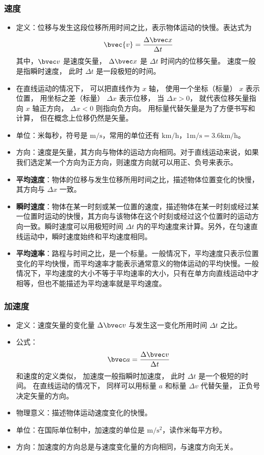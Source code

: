 \subsubsection{速度}
\begin{itemize}
\item 定义：位移与发生这段位移所用时间之比，表示物体运动的快慢。表达式为
\begin{equation}\label{eq_HSPM01_3}
\bvec{v} = \frac{\Delta \bvec x}{\Delta t}
\end{equation}
其中，$\bvec v$ 是速度矢量， $\Delta \bvec x$ 是 $\Delta t$ 时间内的位移矢量。 速度一般是指瞬时速度， 此时 $\Delta t$ 是一段极短的时间。
\item 在直线运动的情况下， 可以把直线作为 $x$ 轴， 使用一个坐标（标量） $x$ 表示位置， 用坐标之差（标量） $\Delta x$ 表示位移， 当 $\Delta x > 0$， 就代表位移矢量指向 $x$ 轴正方向， $\Delta x < 0$ 则指向负方向。 用标量代替矢量是为了方便书写和计算， 但在概念上位移仍然是矢量。
\item 单位：米每秒，符号是 $\mathrm{m/s}$，常用的单位还有 $\mathrm{km/h}$，$1\mathrm{m/s}=3.6\mathrm{km/h}$。
\item 方向：速度是矢量，其方向与物体的运动方向相同。对于直线运动来说，如果我们选定某一个方向为正方向，则速度方向就可以用正、负号来表示。
\item \textbf{平均速度}：物体的位移与发生位移所用时间之比，描述物体位置变化的快慢，其方向与 $\Delta x$ 一致。
\item \textbf{瞬时速度}：物体在某一时刻或某一位置的速度，描述物体在某一时刻或经过某一位置时运动的快慢，其方向与该物体在这个时刻或经过这个位置时的运动方向一致。瞬时速度可以用极短时间 $\Delta t$ 内的平均速度来计算。另外，在匀速直线运动中，瞬时速度始终和平均速度相同。
\item \textbf{平均速率}：路程与时间之比，是一个标量。一般情况下，平均速度只表示位置变化的平均快慢，而平均速率才能表示通常意义的物体运动的平均快慢。一般情况下，平均速度的大小不等于平均速率的大小，只有在单方向直线运动中才相等，但也不能描述为平均速率就是平均速度。
\end{itemize}

\subsubsection{加速度}
\begin{itemize}
\item 定义：速度矢量的变化量 $\Delta \bvec v$ 与发生这一变化所用时间 $\Delta t$ 之比。
\item 公式：
\begin{equation}
\bvec a=\frac{\Delta \bvec v}{\Delta t}
\end{equation}
和速度的定义类似， 加速度一般指瞬时加速度， 此时 $\Delta t$ 是一个极短的时间。 在直线运动的情况下， 同样可以用标量 $a$ 和标量 $\Delta v$ 代替矢量， 正负号决定矢量的方向。
\item 物理意义：描述物体运动速度变化的快慢。
\item 单位：在国际单位制中，加速度的单位是 $\mathrm{m/s^2}$，读作米每平方秒。
\item 方向：加速度的方向总是与速度变化量的方向相同，与速度方向无关。
\end{itemize}

